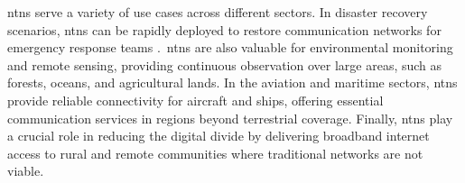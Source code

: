 \glspl{ntn} serve a variety of use cases across different sectors. In disaster recovery scenarios, \glspl{ntn} can be rapidly deployed to restore communication networks for emergency response teams \autocite{ntn_challenges_and_opportunities}.\ \glspl{ntn} are also valuable for environmental monitoring and remote sensing, providing continuous observation over large areas, such as forests, oceans, and agricultural lands. In the aviation and maritime sectors, \glspl{ntn} provide reliable connectivity for aircraft and ships, offering essential communication services in regions beyond terrestrial coverage. Finally, \glspl{ntn} play a crucial role in reducing the digital divide by delivering broadband internet access to rural and remote communities where traditional networks are not viable.

